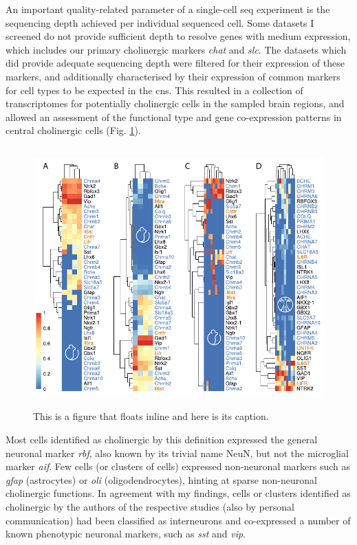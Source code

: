 An important quality-related parameter of a single-cell \ac{seq} experiment is the sequencing depth achieved per individual sequenced cell. Some datasets I screened do not provide sufficient depth to resolve genes with medium expression, which includes our primary cholinergic markers \textit{\ac{chat}} and \textit{\ac{slc}}. The datasets which did provide adequate sequencing depth were filtered for their expression of these markers, and additionally characterised by their expression of common markers for cell types to be expected in the \ac{cns}. This resulted in a collection of transcriptomes for potentially cholinergic cells in the sampled brain regions, and allowed an assessment of the functional type and gene co-expression patterns in central cholinergic cells (Fig. \ref{fig:singlecell}).

\begin{figure}
\centering
\includegraphics[height=10cm]{figures/singlecell}
\caption[Short figure name.]{This is a figure that floats inline and here is its caption.
\label{fig:singlecell}}
\end{figure}

Most cells identified as cholinergic by this definition expressed the general neuronal marker \textit{\acs{rbf}}, also known by its trivial name NeuN, but not the microglial marker \textit{\acs{aif}}. Few cells (or clusters of cells) expressed non-neuronal markers such as \textit{\acs{gfap}} (astrocytes) or \textit{\acs{oli}} (oligodendrocytes), hinting at sparse non-neuronal cholinergic functions. In agreement with my findings, cells or clusters identified as cholinergic by the authors of the respective studies\cite{Zeisel2015, Tasic2016} (also by personal communication) had been classified as interneurons and co-expressed a number of known phenotypic neuronal markers, such as \textit{\ac{sst}} and \textit{\ac{vip}}.

